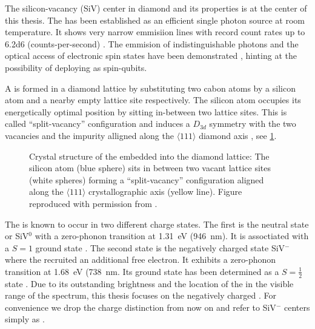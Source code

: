   The silicon-vacancy (SiV) center in diamond and its properties is at the center of this thesis. The \siv has been established as an efficient single photon source at room temperature. It shows very narrow emmisiion lines with record count rates up to \SI{6.2d6}{\cps} (counts-per-second) \cite{janine::55}. The emmision of indistinguishable photons and the optical access of electronic spin states have been demonstrated \cite{janine::27, janine::15, janine::16, janine::17}, hinting at the possibility of deploying \sivs as spin-qubits.

  A \sivc is formed in a diamond lattice by substituting two cabon atoms by a silicon atom and a nearby empty lattice site respectively. The silicon atom occupies its energetically optimal position by sitting in-between two lattice sites. This is called ``split-vacancy'' configuration and induces a $D_{3d}$ symmetry with the two vacancies and the impurity alligned along the $\langle 111 \rangle$ diamond axis \cite{janine:222}, see \cref{fig::siv_lattice}.

  \begin{figure}[htbp]
		\centering
		\caption[Split-vacancy configuration for \sivs in diamond]{Crystal structure of the \siv embedded into the diamond lattice: The silicon atom (blue sphere) sits in between two vacant lattice sites (white spheres) forming a ``split-vacancy'' configuration aligned along the $\langle 111 \rangle$ crystallographic axis (yellow line). Figure reproduced with permission from \cite{janine::thesis}.}
		\label{fig::siv_lattice}
	\end{figure}


  The \siv is known to occur in two different charge states. The first is the neutral state or SiV$^0$ with a zero-phonon transition at \SI{1.31}{\eV} (\SI{946}{\nm}). It is assoctiated with a $S = 1$ ground state \cite{janine::224}. The second state is the negatively charged state SiV$^{-}$ where the \sivc recruited an additional free electron. It exhibits a zero-phonon transition at \SI{1.68}{\eV} (\SI{738}{\nm}. Its ground state has been determined as a $S = \frac{1}{2}$ state \cite{janine::222, janine::223}. Due to its outstanding brightness and the location of the \zpl in the visible range of the spectrum, this thesis focuses on the negatively charged \siv. For convenience we drop the charge distinction from now on and refer to SiV$^{-}$ centers simply as \sivs.


